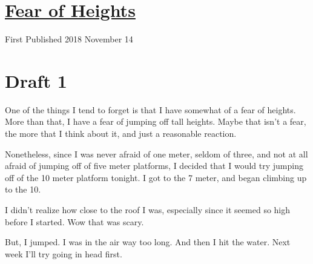 \documentclass[12pt]{article}[titlepage]
\newcommand{\1}{\={a}}
\newcommand{\2}{\={e}}
\newcommand{\3}{\={\i}}
\newcommand{\4}{\=o}
\newcommand{\5}{\=u}
\newcommand{\6}{\={A}}
\renewcommand{\,}{\textsuperscript{,}}
\begin{document}
\doublespacing
\section{\href{fear-of-heights.html}{Fear of Heights}}
First Published 2018 November 14
\section{Draft 1}
One of the things I tend to forget is that I have somewhat of a fear of heights.
More than that, I have a fear of jumping off tall heights.
Maybe that isn't a fear, the more that I think about it, and just a reasonable reaction.

Nonetheless, since I was never afraid of one meter, seldom of three, and not at all afraid of jumping off of five meter platforms, I decided that I would try jumping off of the 10 meter platform tonight.
I got to the 7 meter, and began climbing up to the 10.

I didn't realize how close to the roof I was, especially since it seemed so high before I started.
Wow that was scary.

But, I jumped.
I was in the air way too long.
And then I hit the water.
Next week I'll try going in head first.
\end{document}
